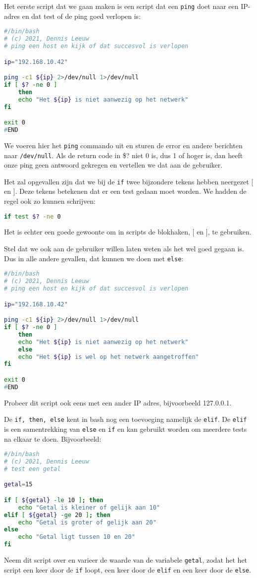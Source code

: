 Het eerste script dat we gaan maken is een script dat een \texttt{ping} doet naar een IP-adres en dat test of de ping goed verlopen is:
\begin{lstlisting}[language=bash]
#/bin/bash
# (c) 2021, Dennis Leeuw
# ping een host en kijk of dat succesvol is verlopen

ip="192.168.10.42"

ping -c1 ${ip} 2>/dev/null 1>/dev/null
if [ $? -ne 0 ]
	then
	echo "Het ${ip} is niet aanwezig op het netwerk"
fi

exit 0
#END
\end{lstlisting}
We voeren hier het \texttt{ping} commando uit en sturen de error en andere berichten naar \texttt{/dev/null}. Als de return code in \$? niet 0 is, dus 1 of hoger is, dan heeft onze ping geen antwoord gekregen en vertellen we dat aan de gebruiker.

Het zal opgevallen zijn dat we bij de \texttt{if} twee bijzondere tekens hebben neergezet [ en ]. Deze tekens betekenen dat er een test gedaan moet worden. We hadden de regel ook zo kunnen schrijven:
\begin{lstlisting}[language=bash]
if test $? -ne 0
\end{lstlisting}
Het is echter een goede gewoonte om in scripts de blokhaken, [ en ], te gebruiken.

Stel dat we ook aan de gebruiker willen laten weten als het wel goed gegaan is. Dus in alle andere gevallen, dat kunnen we doen met \texttt{else}:
\begin{lstlisting}[language=bash]
#/bin/bash
# (c) 2021, Dennis Leeuw
# ping een host en kijk of dat succesvol is verlopen

ip="192.168.10.42"

ping -c1 ${ip} 2>/dev/null 1>/dev/null
if [ $? -ne 0 ]
	then
	echo "Het ${ip} is niet aanwezig op het netwerk"
	else
	echo "Het ${ip} is wel op het netwerk aangetroffen"
fi

exit 0
#END
\end{lstlisting}
Probeer dit script ook eens met een ander IP adres, bijvoorbeeld 127.0.0.1.

De \texttt{if, then, else} kent in bash nog een toevoeging namelijk de \texttt{elif}. De \texttt{elif} is een samentrekking van \texttt{else} en \texttt{if} en kan gebruikt worden om meerdere tests na elkaar te doen. Bijvoorbeeld:
\begin{lstlisting}[language=bash]
#/bin/bash
# (c) 2021, Dennis Leeuw
# test een getal

getal=15

if [ ${getal} -le 10 ]; then
	echo "Getal is kleiner of gelijk aan 10"
elif [ ${getal} -ge 20 ]; then
	echo "Getal is groter of gelijk aan 20"
else
	echo "Getal ligt tussen 10 en 20"
fi
\end{lstlisting}
Neem dit script over en varieer de waarde van de variabele \texttt{getal}, zodat het het script een keer door de \texttt{if} loopt, een keer door de \texttt{elif} en een keer door de \texttt{else}.
